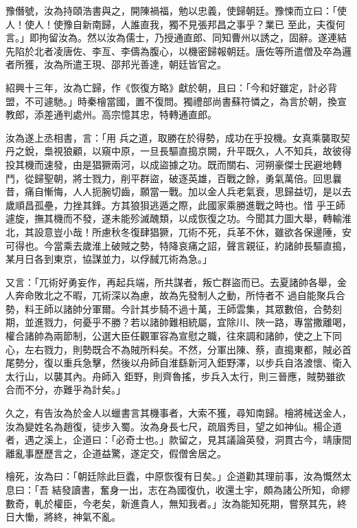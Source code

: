 \begin{pinyinscope}
 豫僭號，汝為持頤浩書與之，開陳禍福，勉以忠義，使歸朝廷。豫悚而立曰：「使人！使人！使豫自新南歸，人誰直我，獨不見張邦昌之事乎？業已
 至此，夫復何言。」即拘留汝為。然以汝為儒士，乃授通直郎、同知曹州以誘之，固辭。遂連結先陷於北者凌唐佐、李亙、李儔為腹心，以機密歸報朝廷。唐佐等所遣僧及卒為邏者所獲，汝為所遣王現、邵邦光善達，朝廷皆官之。



 紹興十三年，汝為亡歸，作《恢復方略》獻於朝，且曰：「今和好雖定，計必背盟，不可遽馳。」時秦檜當國，置不復問。獨禮部尚書蘇符憐之，為言於朝，換宣教郎，添差通判處州。高宗憶其忠，特轉通直郎。



 汝為遂上丞相書，言：「用
 兵之道，取勝在於得勢，成功在乎投機。女真乘襲取契丹之銳，梟視狼顧，以窺中原，一旦長驅直搗京闕，升平既久，人不知兵，故彼得投其機而速發，由是猖獗兩河，以成盜據之功。既而關右、河朔豪傑士民避地轉鬥，從歸聖朝，將士戮力，削平群盜，破逐英雄，百戰之餘，勇氣萬倍。回思曩昔，痛自慚悔，人人扼腕切齒，願當一戰。加以金人兵老氣衰，思歸益切，是以去歲順昌孤壘，力挫其鋒。方其狼狽逃遁之際，此國家乘勝進戰之時也。惜
 乎王師遽旋，撫其機而不發，遂未能殄滅醜類，以成恢復之功。今聞其力圖大舉，轉輸淮北，其設意豈小哉！所慮秋冬復肆猖獗，兀術不死，兵革不休，雖欲各保邊陲，安可得也。今當乘去歲淮上破賊之勢，特降哀痛之詔，聲言親征，約諸帥長驅直搗，某月日各到東京，協謀並力，以俘馘兀術為急。」



 又言：「兀術好勇妄作，再起兵端，所共謀者，叛亡群盜而已。去夏諸帥各舉，金人奔命敗北之不暇，兀術深以為慮，故為先發制人之動，所恃者不
 過自能聚兵合勢，料王師以諸帥分軍爾。今計其步騎不過十萬，王師雲集，其眾數倍，合勢刻期，並進戮力，何憂乎不勝？若以諸帥難相統屬，宜除川、陜一路，專當撒離喝，權合諸帥為兩節制，公選大臣任觀軍容為宣慰之職，往來調和諸帥，使之上下同心，左右戮力，則勢既合不為賊所料矣。不然，分軍出陳、蔡，直搗東都，賊必首尾勢分，復以重兵急擊，然後以舟師自淮繇新河入鉅野澤，以步兵自洛渡懷、衛入太行山，以襲其內。舟師入
 鉅野，則齊魯搖，步兵入太行，則三晉應，賊勢雖欲合而不分，亦難乎為計矣。」



 久之，有告汝為於金人以蠟書言其機事者，大索不獲，尋知南歸。檜將械送金人，汝為變姓名為趙復，徒步入蜀。汝為身長七尺，疏眉秀目，望之如神仙。楊企道者，遇之溪上，企道曰：「必奇士也。」款留之，見其議論英發，洞貫古今，靖康間離亂事歷歷言之，企道益驚，遂定交，假僧舍居之。



 檜死，汝為曰：「朝廷除此巨蠹，中原恢復有日矣。」企道勸其理前事，汝為慨然太息曰：「吾
 結發讀書，奮身一出，志在為國復仇，收還土宇，頗為諸公所知，命繆數奇，軋於權臣，今老矣，新進貴人，無知我者。」汝為能知死期，嘗祭其先，終日大慟，將終，神氣不亂。




\end{pinyinscope}
